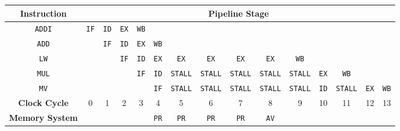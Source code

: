 \begin{tabular}{|*{15}{c|}}
	\hline
	\textbf{Instruction} & \multicolumn{14}{c|}{\textbf{Pipeline Stage}} \\
	\hline
	\texttt{ADDI} & \texttt{IF} & \texttt{ID} & \texttt{EX} & \texttt{WB} & & & & & & & & & & 	\\
	\texttt{ADD} & & \texttt{IF} & \texttt{ID} & \texttt{EX} & \texttt{WB} & & & & & & & & & 	\\
	\texttt{LW} & & & \texttt{IF} & \texttt{ID} & \texttt{EX} & \texttt{EX} & \texttt{EX} & \texttt{EX} & \texttt{EX} & \texttt{WB} & & & & \\
	\texttt{MUL} & & & & \texttt{IF} & \texttt{ID} & {\color{red}\texttt{STALL}} & {\color{red}\texttt{STALL}} & {\color{red}\texttt{STALL}} & {\color{red}\texttt{STALL}} & {\color{red}\texttt{STALL}} & \texttt{EX} & \texttt{WB} & & \\
	\texttt{MV} & & & & & \texttt{IF} & {\color{red}\texttt{STALL}} & {\color{red}\texttt{STALL}} & {\color{red}\texttt{STALL}} & {\color{red}\texttt{STALL}} & {\color{red}\texttt{STALL}} & \texttt{ID} & {\color{red}\texttt{STALL}} & \texttt{EX} & \texttt{WB} \\
	\hline
	\hline
	\textbf{Clock Cycle} & 0 & 1 & 2 & 3 & 4 & 5 & 6 & 7 & 8 & 9 & 10 & 11 & 12 & 13 \\ 
	\hline
	\hline
	\textbf{Memory System} & & & & & \texttt{PR} & \texttt{PR} & \texttt{PR} & \texttt{PR} & \texttt{AV} &&&&& \\
	\hline
\end{tabular}